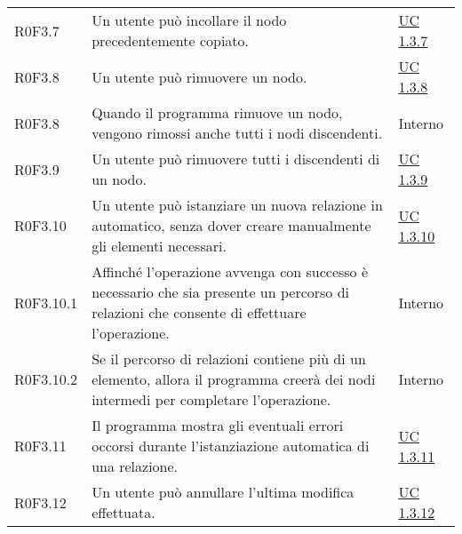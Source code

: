 \begin{center}
\begin{longtable}{p{4.2cm}!{\color{white}\vrule width 0.5mm}p{6cm}!{\color{white}\vrule width 0.5mm}p{2.5cm}!{\color{white}\vrule width 0.5mm}}
			\hspace{2mm}\hypertarget{XER0F3.7}{R0F3.7} & Un utente può incollare il nodo precedentemente copiato. & \hyperref[subsec:XEUC1.3.7]{UC 1.3.7}\\
	
			\hspace{2mm}\hypertarget{XER0F3.8}{R0F3.8} & Un utente può rimuovere un nodo. & \hyperref[subsec:XEUC1.3.8]{UC 1.3.8}\\
				
				\hspace{4mm}\hypertarget{XER0F3.8}{R0F3.8} & Quando il programma rimuove un nodo, vengono rimossi anche tutti i nodi discendenti. & Interno\\
	
			\hspace{2mm}\hypertarget{XER0F3.9}{R0F3.9} & Un utente può rimuovere tutti i discendenti di un nodo. & \hyperref[subsec:XEUC1.3.9]{UC 1.3.9}\\
			
			\hspace{2mm}\hypertarget{XER0F3.10}{R0F3.10} & Un utente può istanziare un nuova relazione in automatico, senza dover creare manualmente gli elementi necessari. & \hyperref[subsec:XEUC1.3.10]{UC 1.3.10}\\
			
				\hspace{4mm}\hypertarget{XER0F3.10.1}{R0F3.10.1} & Affinché l'operazione avvenga con successo è necessario che sia presente un percorso di relazioni che consente di effettuare l'operazione. & Interno\\
	
				\hspace{4mm}\hypertarget{XER0F3.10.2}{R0F3.10.2} & Se il percorso di relazioni contiene più di un elemento, allora il programma creerà dei nodi intermedi per completare l'operazione. & Interno\\
	
			\hspace{2mm}\hypertarget{XER0F3.11}{R0F3.11} & Il programma mostra gli eventuali errori occorsi durante l'istanziazione automatica di una relazione. & \hyperref[subsec:XEUC1.3.11]{UC 1.3.11}\\
	
	
			\hspace{2mm}\hypertarget{XER0F3.12}{R0F3.12} & Un utente può annullare l'ultima modifica effettuata. & \hyperref[subsec:XEUC1.3.12]{UC 1.3.12}\\
			

\end{longtable}
\end{center}
